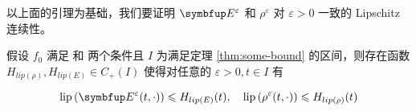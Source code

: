 




以上面的引理为基础，我们要证明 $\vE^\varepsilon$ 和 $\rho^\varepsilon$ 对 $\varepsilon>0$ 一致的 Lipschitz 连续性。
\begin{lemma}
    假设 $f_{0}$ 满足 \supremumf 和 \lipOffVsphere 两个条件且 $I$ 为满足定理 \ref{thm:some-bound} 的区间，则存在函数 $H_{lip(\rho)}, H_{lip(E)} \in C_{+}(I)$ 使得对任意的 $\varepsilon>0, t \in I$ 有

        \[
        \operatorname{lip}\left(\vE^{\varepsilon}(t, \cdot)\right) \leqslant H_{lip(E)}(t), \quad \operatorname{lip}\left(\rho^{\varepsilon}(t, \cdot)\right) \leqslant H_{lip(\rho)}(t)
        \]
\end{lemma}


